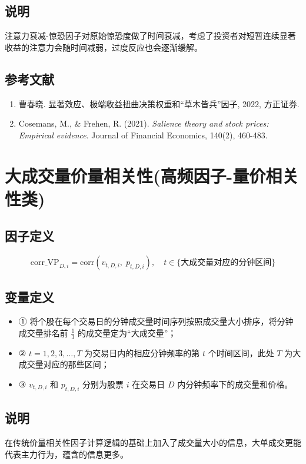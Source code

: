 \documentclass{article}
\begin{document}
\subsection{说明}
注意力衰减-惊恐因子对原始惊恐度做了时间衰减，考虑了投资者对短暂连续显著收益的注意力会随时间减弱，过度反应也会逐渐缓解。

\subsection{参考文献}
\begin{enumerate}
    \item 曹春晓. 显著效应、极端收益扭曲决策权重和“草木皆兵”因子, 2022, 方正证券.
    \item Cosemans, M., \& Frehen, R. (2021). \textit{Salience theory and stock prices: Empirical evidence}. Journal of Financial Economics, 140(2), 460-483.
\end{enumerate}

\section{大成交量价量相关性(高频因子-量价相关性类)}

\subsection{因子定义}
\begin{equation}
    \mathrm{corr\_VP}_{D,i} = \mathrm{corr} \left( v_{t,D,i}, \; p_{t,D,i} \right), \quad t \in \{ \text{大成交量对应的分钟区间} \}
\end{equation}

\subsection{变量定义}
\begin{itemize}
    \item ① 将个股在每个交易日的分钟成交量时间序列按照成交量大小排序，将分钟成交量排名前 \( \frac{1}{3} \) 的成交量定为“大成交量”；
    \item ② \( t=1,2,3,\ldots,T \) 为交易日内的相应分钟频率的第 \( t \) 个时间区间，此处 \( T \) 为大成交量对应的那些区间；
    \item ③ \( v_{t,D,i} \) 和 \( p_{t,D,i} \) 分别为股票 \( i \) 在交易日 \( D \) 内分钟频率下的成交量和价格。
\end{itemize}

\subsection{说明}
在传统价量相关性因子计算逻辑的基础上加入了成交量大小的信息，大单成交更能代表主力行为，蕴含的信息更多。
\end{document}
